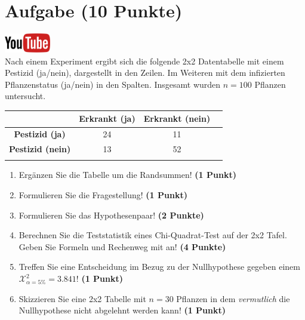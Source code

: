 \documentclass[a4paper, 10pt]{scrartcl}\usepackage[]{graphicx}\usepackage[]{xcolor}
\begin{document}
\section{Aufgabe \hfill (10 Punkte)}

\hfill\href{https://youtu.be/PVUK0zdkZkk}{\includegraphics[width =
  2cm]{img/youtube}}\\[1Ex]




Nach einem Experiment ergibt sich die folgende 2x2 Datentabelle mit einem
Pestizid (ja/nein), dargestellt in den Zeilen. Im Weiteren mit dem
infizierten Pflanzenstatus (ja/nein) in den Spalten. Insgesamt wurden
$n = 100$ Pflanzen untersucht.
\vspace{5Ex}

\begin{center}
  \Large
  \begin{tabular}{c|c|c|c}
     & \textbf{Erkrankt (ja)} & \textbf{Erkrankt (nein)} &  \strut\\
    \hline
    \textbf{Pestizid (ja)} & 24  & 11  &     \strut\\
    \hline
    \textbf{Pestizid (nein)} & 13  & 52  &      \strut\\
    \hline
     \phantom{100} & \phantom{100}  & \phantom{100}  &  \phantom{100}  \strut\\
  \end{tabular}
\end{center}

\vspace{5Ex}

\begin{enumerate}
\item Erg{\"a}nzen Sie die Tabelle um die Randsummen! \textbf{(1 Punkt)} 
\item Formulieren Sie die Fragestellung! \textbf{(1 Punkt)}
\item Formulieren Sie das Hypothesenpaar! \textbf{(2 Punkte)}
\item Berechnen Sie die Teststatistik eines Chi-Quadrat-Test auf der 2x2
  Tafel. Geben Sie Formeln und Rechenweg mit an! \textbf{(4 Punkte)}
\item Treffen Sie eine Entscheidung im Bezug zu der Nullhypothese gegeben
  einem $\mathcal{X}^2_{\alpha = 5\%} = 3.841$! \textbf{(1 Punkt)}
\item Skizzieren Sie eine 2x2 Tabelle mit
  $n = 30$ Pflanzen in dem \textit{vermutlich}
  die Nullhypothese nicht abgelehnt werden kann! \textbf{(1 Punkt)}
\end{enumerate} 
\clearpage
\end{document}
